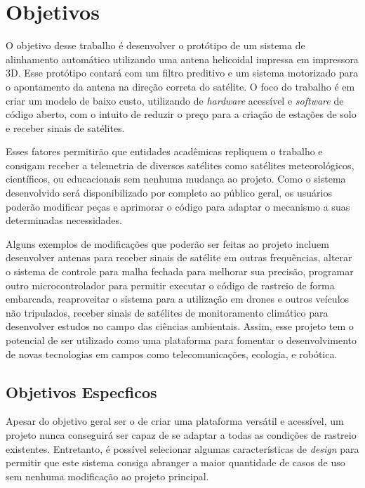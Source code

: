 

\chapter{Objetivos}\label{cap:obj}

O objetivo desse trabalho é desenvolver o protótipo de um sistema de alinhamento automático utilizando uma antena helicoidal impressa em impressora 3D.
Esse protótipo contará com um filtro preditivo e um sistema motorizado para o apontamento da antena na direção correta do satélite.
O foco do trabalho é em criar um modelo de baixo custo, utilizando de \textit{hardware} acessível e \textit{software} de código aberto, com o intuito de reduzir o preço para a criação de estações de solo e receber sinais de satélites.

Esses fatores permitirão que entidades acadêmicas repliquem o trabalho e consigam receber a telemetria de diversos satélites como satélites meteorológicos, científicos, ou educacionais sem nenhuma mudança ao projeto.
Como o sistema desenvolvido será disponibilizado por completo ao público geral, os usuários poderão modificar peças e aprimorar o código para adaptar o mecanismo a suas determinadas necessidades.

Alguns exemplos de modificações que poderão ser feitas ao projeto incluem desenvolver antenas para receber sinais de satélite em outras frequências, alterar o sistema de controle para malha fechada para melhorar sua precisão, programar outro microcontrolador para permitir executar o código de rastreio de forma embarcada, reaproveitar o sistema para a utilização em drones e outros veículos não tripulados, receber sinais de satélites de monitoramento climático para desenvolver estudos no campo das ciências ambientais.
Assim, esse projeto tem o potencial de ser utilizado como uma plataforma para fomentar o desenvolvimento de novas tecnologias em campos como telecomunicações, ecologia, e robótica.

\section{Objetivos Especficos}\label{sec:esp}
Apesar do objetivo geral ser o de criar uma plataforma versátil e acessível, um projeto nunca conseguirá ser capaz de se adaptar a todas as condições de rastreio existentes.
Entretanto, é possível selecionar algumas características de \textit{design} para permitir que este sistema consiga abranger a maior quantidade de casos de uso sem nenhuma modificação ao projeto principal.

